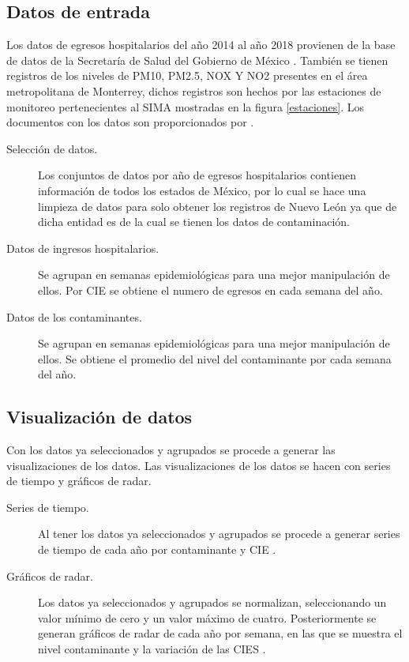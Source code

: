 \subsection{Datos de entrada}
Los datos de egresos hospitalarios del año 2014 al año 2018 provienen de la base de datos de la Secretaría de Salud del Gobierno de México \cite{f1}. También se tienen registros de los niveles de PM10, PM2.5, NOX Y NO2 presentes en el área metropolitana de Monterrey, dichos registros son hechos por las estaciones de monitoreo pertenecientes al SIMA \cite{f2} mostradas en la figura \ref{estaciones}. Los documentos con los datos son proporcionados por \citeauthor{f3}.

\begin{description}
\item [Selección de datos.] {Los conjuntos de datos por año de egresos hospitalarios contienen información de todos los estados de México, por lo cual se hace una limpieza de datos para solo obtener los registros de Nuevo León ya que de dicha entidad es de la cual se tienen los datos de contaminación.}
\item [Datos de ingresos hospitalarios.] {Se agrupan en semanas epidemiológicas para una mejor manipulación de ellos. Por CIE \citep{r9} se obtiene el numero de egresos en cada semana del año.}
\item [Datos de los contaminantes.] {Se agrupan en semanas epidemiológicas para una mejor manipulación de ellos. Se obtiene el promedio del nivel del contaminante por cada semana del año.}
\end{description}

\subsection{Visualización de datos}
Con los datos ya seleccionados y agrupados se procede a generar las visualizaciones de los datos. Las visualizaciones de los datos se hacen con series de tiempo y gráficos de radar.

\begin{description}
\item [Series de tiempo.] {Al tener los datos ya seleccionados y agrupados se procede a generar series de tiempo de cada año por contaminante y CIE \citep{r9}}.
\item [Gráficos de radar.] {Los datos ya seleccionados y agrupados se normalizan, seleccionando un valor mínimo de cero y un valor máximo de cuatro. Posteriormente se generan gráficos de radar de cada año por semana, en las que se muestra el nivel contaminante y la variación de las CIES \citep{r9}}.
\end{description}

